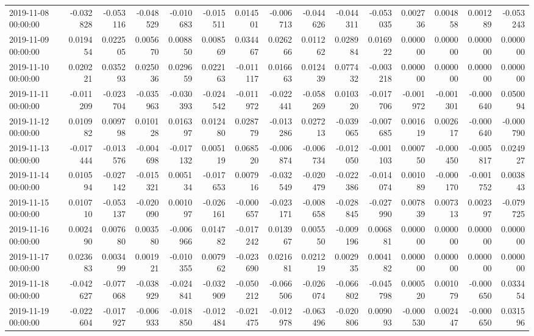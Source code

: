 \begin{tabular}{lrrrrrrrrrrrrrr}
2019-11-08 00:00:00 & -0.032828 & -0.053116 & -0.048529 & -0.010683 & -0.015511 & 0.014501 & -0.006713 & -0.044626 & -0.044311 & -0.053035 & 0.002736 & 0.004858 & 0.001289 & -0.053243 \\
2019-11-09 00:00:00 & 0.019454 & 0.022505 & 0.005670 & 0.008850 & 0.008569 & 0.034467 & 0.026266 & 0.011262 & 0.028984 & 0.016922 & 0.000000 & 0.000000 & 0.000000 & 0.000000 \\
2019-11-10 00:00:00 & 0.020221 & 0.035293 & 0.025036 & 0.029659 & 0.022163 & -0.011117 & 0.016663 & 0.012439 & 0.077432 & -0.003218 & 0.000000 & 0.000000 & 0.000000 & 0.000000 \\
2019-11-11 00:00:00 & -0.011209 & -0.023704 & -0.035963 & -0.030393 & -0.024542 & -0.011972 & -0.022441 & -0.058269 & 0.010320 & -0.017706 & -0.001972 & -0.001301 & -0.000640 & 0.050094 \\
2019-11-12 00:00:00 & 0.010982 & 0.009798 & 0.010128 & 0.016397 & 0.012480 & 0.028779 & -0.013286 & 0.027213 & -0.039065 & -0.007685 & 0.001619 & 0.002617 & -0.000640 & -0.000790 \\
2019-11-13 00:00:00 & -0.017444 & -0.013576 & -0.004698 & -0.017132 & 0.005119 & 0.068520 & -0.006874 & -0.006734 & -0.012050 & -0.001103 & 0.000750 & -0.000450 & -0.005817 & 0.024927 \\
2019-11-14 00:00:00 & 0.010594 & -0.027142 & -0.015321 & 0.005134 & -0.017653 & 0.007916 & -0.032549 & -0.020479 & -0.022386 & -0.014074 & 0.001089 & -0.000170 & -0.001752 & 0.003843 \\
2019-11-15 00:00:00 & 0.010710 & -0.053137 & -0.020090 & 0.001097 & -0.026161 & -0.000657 & -0.023171 & -0.008658 & -0.028845 & -0.027990 & 0.007839 & 0.007313 & 0.002397 & -0.079725 \\
2019-11-16 00:00:00 & 0.002490 & 0.007680 & 0.003580 & -0.006966 & 0.014782 & -0.017242 & 0.013967 & 0.005550 & -0.009196 & 0.006881 & 0.000000 & 0.000000 & 0.000000 & 0.000000 \\
2019-11-17 00:00:00 & 0.023683 & 0.003499 & 0.001921 & -0.010355 & 0.007962 & -0.023690 & 0.021681 & 0.021219 & 0.002935 & 0.004182 & 0.000000 & 0.000000 & 0.000000 & 0.000000 \\
2019-11-18 00:00:00 & -0.042627 & -0.077068 & -0.038929 & -0.024841 & -0.032909 & -0.050212 & -0.066506 & -0.026074 & -0.066802 & -0.045798 & 0.000520 & 0.001079 & -0.000650 & 0.033454 \\
2019-11-19 00:00:00 & -0.022604 & -0.017927 & -0.006933 & -0.018850 & -0.012484 & -0.021475 & -0.012978 & -0.063496 & -0.020806 & 0.009093 & -0.000530 & 0.002447 & -0.000650 & 0.031596 \\

\end{tabular}
